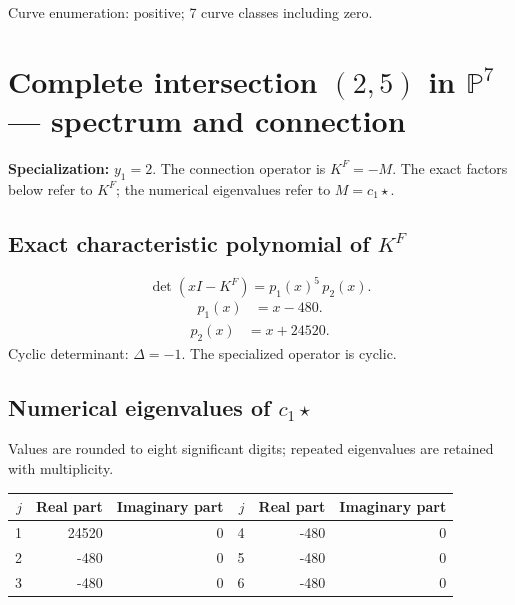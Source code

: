 \documentclass[10pt,a4paper]{article}
\begin{document}
Curve enumeration: positive; 7 curve classes including zero.
\clearpage\section*{Complete intersection $(2,5)$ in $\mathbb P^{7}$ --- spectrum and connection}
\textbf{Specialization:} $y_1=2$. The connection operator is $K^F=-M$. The exact factors below refer to $K^F$; the numerical eigenvalues refer to $M=c_1\star$.
\subsection*{Exact characteristic polynomial of $K^F$}
\[\det(xI-K^F)=p_{1}(x)^{5}\,p_{2}(x).\]
\[\begin{aligned}p_{1}(x)&=x - 480.\end{aligned}\]
\[\begin{aligned}p_{2}(x)&=x + 24520.\end{aligned}\]
Cyclic determinant: $\Delta=-1$. The specialized operator is cyclic.
\subsection*{Numerical eigenvalues of $c_1\star$}
Values are rounded to eight significant digits; repeated eigenvalues are retained with multiplicity.
\begin{center}\small\begin{tabular}{rrr@{\qquad}rrr}\toprule $j$ & Real part & Imaginary part & $j$ & Real part & Imaginary part\\\midrule
1 & 24520 & 0 & 4 & -480 & 0\\
2 & -480 & 0 & 5 & -480 & 0\\
3 & -480 & 0 & 6 & -480 & 0\\
\bottomrule\end{tabular}\end{center}
\end{document}
